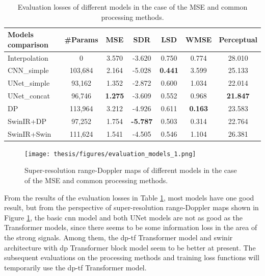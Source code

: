 \begin{table}
    \centering
    \caption{Evaluation losses of different models in the case of the MSE and common processing methods.}
    \label{models comparison in the case of the MSE and original processing methods}
    \begin{tabular}{l|c|c|c|c|c|c}
        \hline
        Models comparison & \#Params & MSE & SDR & LSD & WMSE & Perceptual \\
        \hline
        Interpolation & 0 & 3.570 & -3.620 & 0.750 & 0.774 & 28.010 \\
        \hline
        CNN\_simple & 103,684 & 2.164 & -5.028 & \textbf{0.441} & 3.599 & 25.133 \\
        \hline
        UNet\_simple & 93,162 & 1.352 & -2.872 & 0.600 & 1.034 & 22.014 \\
        \hline
        UNet\_concat & 96,746 & \textbf{1.275} & -3.609 & 0.552 & 0.968 & \textbf{21.847} \\
        \hline
        DP & 113,964 & 3.212 & -4.926 & 0.611 & \textbf{0.163} & 23.583 \\
        \hline
        SwinIR+DP & 97,252 & 1.754 & \textbf{-5.787} & 0.503 & 0.314 & 22.764 \\
        \hline
        SwinIR+Swin & 111,624 & 1.541 & -4.505 & 0.546 & 1.104 & 26.381 \\
        \hline
    \end{tabular}
\end{table}

\begin{figure}
    \centering
    \texttt{[image: thesis/figures/evaluation\_models\_1.png]}
    \caption{Super-resolution range-Doppler maps of different models in the case of the MSE and common processing methods.}
    \label{evaluation models 1}
\end{figure}

From the results of the evaluation losses in Table \ref{models comparison in the case of the MSE and original processing methods}, most models have one good result, but from the perspective of super-resolution range-Doppler maps shown in Figure \ref{evaluation models 1}, the basic \gls{cnn} model and both UNet models are not as good as the Transformer models, since there seems to be some information loss in the area of the strong signals. Among them, the \gls{dp}-\gls{tf} Transformer model and \gls{swinir} architecture with \gls{dp} Transformer block model seem to be better at present. The subsequent evaluations on the processing methods and training loss functions will temporarily use the \gls{dp}-\gls{tf} Transformer model.

